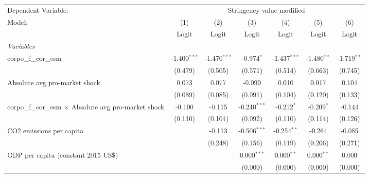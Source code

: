 
\begingroup
\centering
\begin{tabular}{lcccccc}
   \toprule
   Dependent Variable: & \multicolumn{6}{c}{Stringency value modified}\\
   Model:                                                        & (1)            & (2)            & (3)            & (4)            & (5)           & (6)\\  
                                                                 &  Logit         & Logit          & Logit          & Logit          & Logit         & Logit\\  
   \midrule
   \emph{Variables}\\
   corpo\_f\_cor\_esm                                            & -1.400$^{***}$ & -1.470$^{***}$ & -0.974$^{*}$   & -1.437$^{***}$ & -1.480$^{**}$ & -1.719$^{**}$\\   
                                                                 & (0.479)        & (0.505)        & (0.571)        & (0.514)        & (0.663)       & (0.745)\\   
   Absolute avg pro-market shock                                 & 0.073          & 0.077          & -0.090         & 0.010          & 0.017         & 0.104\\   
                                                                 & (0.089)        & (0.085)        & (0.091)        & (0.104)        & (0.120)       & (0.133)\\   
   corpo\_f\_cor\_esm $\times$ Absolute avg pro-market shock     & -0.100         & -0.115         & -0.240$^{***}$ & -0.212$^{*}$   & -0.209$^{*}$  & -0.144\\   
                                                                 & (0.110)        & (0.104)        & (0.092)        & (0.110)        & (0.114)       & (0.126)\\   
   CO2 emissions per capita                                      &                & -0.113         & -0.506$^{***}$ & -0.254$^{**}$  & -0.264        & -0.085\\   
                                                                 &                & (0.248)        & (0.156)        & (0.119)        & (0.206)       & (0.271)\\   
   GDP per capita (constant 2015 US\$)                           &                &                & 0.000$^{***}$  & 0.000$^{**}$   & 0.000$^{**}$  & 0.000\\   
                                                                 &                &                & (0.000)        & (0.000)        & (0.000)       & (0.000)\\   

\end{tabular}
